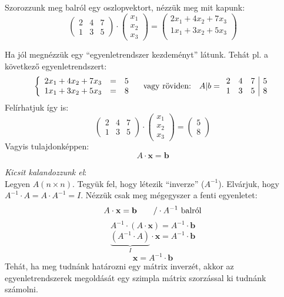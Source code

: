 \documentclass[a4paper,12pt,twoside]{book}
\newcommand{\vek}[1]{\mathbf{#1}} %
\theoremstyle{break}
\begin{document}
Szorozzunk meg balról egy oszlopvektort, nézzük meg mit kapunk:
\[\begin{pmatrix}
2 & 4 & 7 \\
1 & 3 & 5 
\end{pmatrix} \cdot \begin{pmatrix}
x_1 \\
x_2 \\
x_3
\end{pmatrix} =
\begin{pmatrix}
2x_1+4x_2+7x_3 \\
1x_1+3x_2+5x_3 \\
\end{pmatrix}\]

Ha jól megnézzük egy ``egyenletrendszer kezdeményt'' látunk. Tehát pl. a következő egyenletrendszert:
\[\left\{\begin{array}{lcr}2x_1+4x_2+7x_3 & = & 5 \\
1x_1+3x_2+5x_3 & = & 8\end{array} \right. \quad \hbox{vagy röviden:} \quad A|b = \begin{array}{ccc|c}
2 & 4 & 7 & 5 \\
1 & 3 & 5 & 8 \\
\end{array}\]
Felírhatjuk így is:
\[\begin{pmatrix}
2 & 4 & 7 \\
1 & 3 & 5 
\end{pmatrix} \cdot \begin{pmatrix}
x_1 \\
x_2 \\
x_3
\end{pmatrix} = \begin{pmatrix}
5 \\
8 \end{pmatrix}\]
Vagyis tulajdonképpen:
\[A\cdot \vek{x} = \vek{b}\]

\emph{Kicsit kalandozzunk el}:\\
Legyen $A(n\times n)$. Tegyük fel, hogy létezik ``inverze'' ($A^{-1}$). Elvárjuk, hogy $A^{-1}\cdot A = A\cdot A^{-1} = I$.
Nézzük csak meg mégegyszer a fenti egyenletet:
\[A\cdot \vek{x} = \vek{b} \qquad /\cdot A^{-1} \hbox{ balról}\]
\[A^{-1}\cdot (A\cdot \vek{x}) = A^{-1}\cdot\vek{b}\]
\[\underbrace{(A^{-1}\cdot A)}_{I}\cdot \vek{x} = A^{-1}\cdot\vek{b}\]
\[\vek{x} = A^{-1}\cdot\vek{b}\]
Tehát, ha meg tudnánk határozni egy mátrix inverzét, akkor az egyenletrendszerek megoldását egy szimpla mátrix szorzással ki tudnánk számolni.
\end{document}
